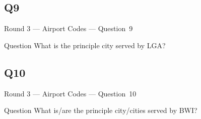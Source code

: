 \documentclass[11pt]{beamer}
\begin{document}
\subsection*{Q9}
\begin{frame}[t]{Round 3 --- Airport Codes --- \mbox{Question 9}}
\begin{block}{Question}
What is the principle city served by LGA\@?
\end{block}
\end{frame}
\subsection*{Q10}
\begin{frame}[t]{Round 3 --- Airport Codes --- \mbox{Question 10}}
\begin{block}{Question}
What is/are the principle city/cities served by BWI\@?
\end{block}
\end{frame}
\end{document}
